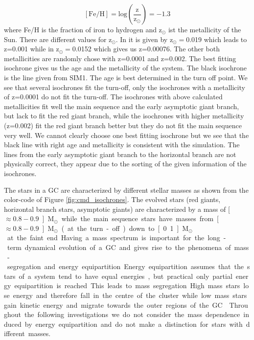 \begin{equation}\label{eq:metallicity}
\mathrm{[Fe/H]=log\left(\frac{z}{z_\odot}\right)=-1.3}
\end{equation} where Fe/H is the fraction of iron to hydrogen and z$_\odot$ ist the metallicity of the Sun. There are different values for z$_\odot$. In \citet{2008A&A...482..883M} it is given by z$_\odot=$0.019 which leads to z=0.001 while in \citet{2012MNRAS.427..127B} z$_\odot=$0.0152 which gives us z=0.00076. The other both metallicities are randomly chose with z=0.0001 and z=0.002.
The best fitting isochrone gives us the age and the metallicity of the system. The black isochrone is the line given from SIM1. The age is best determined in the turn off point. We see that several isochrones fit the turn-off, only the isochrones with a metallicity of z=0.0001 do not fit the turn-off. The isochrones with above calculated metallicities fit well the main sequence and the early asymptotic giant branch, but lack to fit the red giant branch, while the isochrones with higher metallicity (z=0.002) fit the red giant branch better but they do not fit the main sequence very well. We cannot clearly choose one best fitting isochrone but we see that the black line with right age and metallicity is consistent with the simulation. The lines from the early asymptotic giant branch to the horizontal branch are not physically correct, they appear due to the sorting of the given information of the isochrones. 
\par The stars in a \ac{GC} are characterized by different stellar masses as shown from the color-code of Figure \ref{fig:cmd_isochrones}. The evolved stars (red giants, horizontal branch stars, asymptotic giants) are characterized by a mass of \unit[\(\approx0.8-0.9\)]{\(\mathrm{M}_\odot\)} while the main sequence stars have masses from \unit[\(\approx0.8-0.9\)]{\(\mathrm{M}_\odot\)} (at the turn-off) down to \unit[0.1]{M\(_\odot\)} at the faint end. Having a mass spectrum is important for the long-term dynamical evolution of a \ac{GC} and gives rise to the phenomena of mass-segregation and energy equipartition. Energy equipartition assumes that the stars of a system tend to have equal energies, but practical only partial energy equipartition is reached. This leads to mass segregation. High mass stars lose energy and therefore fall in the centre of the cluster while low mass stars gain kinetic energy and migrate towards the outer regions of the \ac{GC} \citep{2013MNRAS.435.3272T}. Throughout the following investigations we do not consider the mass dependence induced by energy equipartition and do not make a distinction for stars with different masses. 

